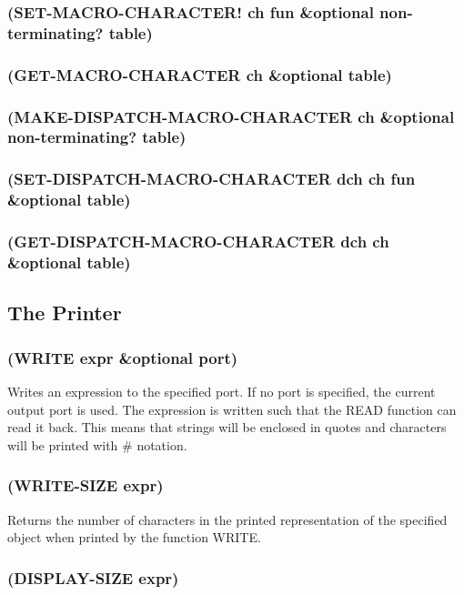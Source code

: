\documentclass[11pt]{article}
\begin{document}
\subsubsection{(SET-MACRO-CHARACTER! ch fun \&optional non-terminating? table)}
\label{sec-4-32-3}

\subsubsection{(GET-MACRO-CHARACTER ch \&optional table)}
\label{sec-4-32-4}

\subsubsection{(MAKE-DISPATCH-MACRO-CHARACTER ch \&optional non-terminating? table)}
\label{sec-4-32-5}

\subsubsection{(SET-DISPATCH-MACRO-CHARACTER dch ch fun \&optional table)}
\label{sec-4-32-6}

\subsubsection{(GET-DISPATCH-MACRO-CHARACTER dch ch \&optional table)}
\label{sec-4-32-7}
\subsection{The Printer}
\label{sec-4-33}

\subsubsection{(WRITE expr \&optional port)}
\label{sec-4-33-1}

Writes an expression to the specified port.  If no port is specified,
the current output port is used.  The expression is written such that
the READ function can read it back.  This means that strings will be
enclosed in quotes and characters will be printed with \# notation.
\subsubsection{(WRITE-SIZE expr)}
\label{sec-4-33-2}

Returns the number of characters in the printed representation of the
specified object when printed by the function WRITE.
\subsubsection{(DISPLAY-SIZE expr)}
\label{sec-4-33-3}
\end{document}
